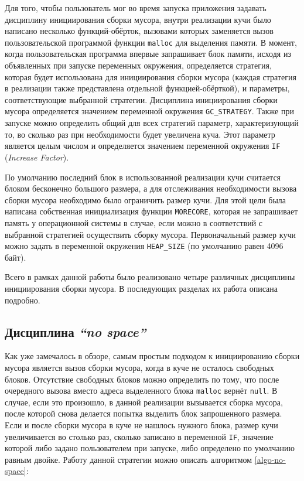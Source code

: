 Для того, чтобы пользователь мог во время запуска приложения задавать дисциплину 
инициирования
сборки мусора, внутри реализации кучи было написано несколько функций-обёрток, 
вызовами которых 
заменяется вызов пользовательской программой функции \texttt{malloc} для выделения памяти. 
В момент, когда
пользовательская программа впервые запрашивает блок памяти, исходя из объявленных
при запуске переменных окружения, определяется стратегия, которая будет использована 
для инициирования сборки мусора (каждая стратегия в реализации также представлена 
отдельной функцией-обёрткой), и параметры, соответствующие выбранной стратегии. 
Дисциплина инициирования сборки 
мусора определяется значением переменной окружения \texttt{GC\_STRATEGY}. Также при запуске 
можно определить общий для всех стратегий параметр, характеризующий то, во сколько раз
при необходимости будет увеличена куча. Этот параметр является целым числом
и определяется значением переменной окружения \texttt{IF}
(\emph{Increase Factor}). 

По умолчанию последний блок в использованной реализации кучи считается блоком бесконечно
большого размера, а для отслеживания необходимости вызова сборки мусора
необходимо было ограничить размер кучи. Для этой цели была написана собственная инициализация
функции \texttt{MORECORE}, которая не запрашивает память у операционной системы в случае, если можно
в соответствий с выбранной стратегией осуществить сборку мусора. Первоначальный размер кучи можно задать
в переменной окружения \texttt{HEAP\_SIZE} (по умолчанию равен 4096 байт).

Всего в рамках данной работы было реализовано четыре различных дисциплины
инициирования сборки мусора. В последующих разделах их работа описана подробно.

\subsection{Дисциплина \emph{``no space''}}
Как уже замечалось в обзоре, самым простым подходом к инициированию
сборки мусора является вызов сборки мусора, когда в куче не осталось 
свободных блоков. Отсутствие свободных блоков можно определить по тому,
что после очередного вызова вместо адреса выделенного блока \texttt{malloc} вернёт
\texttt{null}. В случае, если это произошло, в данной реализации вызывается сборка мусора,
после которой снова делается попытка выделить блок запрошенного размера.
Если и после сборки мусора в куче не нашлось нужного блока, размер кучи
увеличивается во столько раз, сколько записано в переменной \texttt{IF},
значение которой либо задано пользователем при запуске, либо определено
по умолчанию равным двойке.
Работу данной стратегии можно описать алгоритмом \ref{algo-no-space}:


